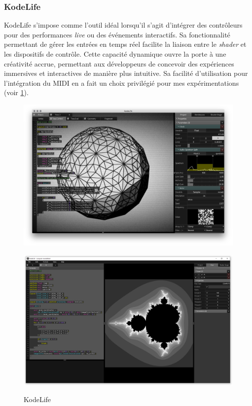 \subsubsection*{KodeLife}

KodeLife s'impose comme l'outil idéal lorsqu'il s'agit d'intégrer des contrôleurs pour des performances \textit{live} ou des événements interactifs. Sa fonctionnalité permettant de gérer les entrées en temps réel facilite la liaison entre le \textit{shader} et les dispositifs de contrôle. Cette capacité dynamique ouvre la porte à une créativité accrue, permettant aux développeurs de concevoir des expériences immersives et interactives de manière plus intuitive. Sa facilité d'utilisation pour l'intégration du MIDI en a fait un choix privilégié pour mes expérimentations (voir \ref{outilsshadK}).

\begin{figure}[h]
  \begin{minipage}[b]{0.45\linewidth}
    \centering
    \includegraphics[width=\linewidth]{images/livecoding/outilsshad02.png}
    \label{outilsshad02}
  \end{minipage}
  \hfill
  \begin{minipage}[b]{0.45\linewidth}
    \centering
    \includegraphics[width=\linewidth]{images/livecoding/outilsshad03.png}
    \label{outilsshad03}
  \end{minipage}
  \caption{KodeLife}
  \label{outilsshadK}
\end{figure}


